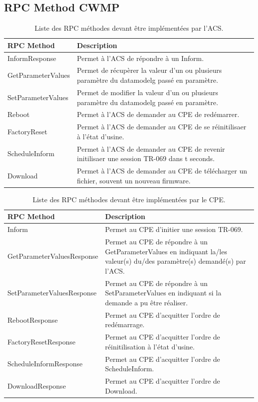 \documentclass[12pt,a4paper]{report}
\begin{document}
\begin{appendix}
\chapter{RPC Method CWMP}
\begin{table}
	\begin{tabularx}{17cm}{|l|X|}
		\hline
		RPC Method & Description\tabularnewline
		\hline
		InformResponse & Permet à l'ACS de répondre à un Inform.\tabularnewline
		\hline
		GetParameterValues & Permet de récupèrer la valeur d'un ou plusieurs 				paramètre du {datamodelg} passé en paramètre.\tabularnewline
		\hline
		SetParameterValues & Permet de modifier la valeur d'un ou plusieurs 				paramètre du {datamodelg} passé en paramètre.\tabularnewline
		\hline
		Reboot & Permet à l'ACS de demander au CPE de redémarrer.\tabularnewline
		\hline
		FactoryReset & Permet à l'ACS de demander au CPE de se réinitilisaer à l'état d'usine.\tabularnewline
		\hline
		ScheduleInform & Permet à l'ACS de demander au CPE de revenir initilisaer une session TR-069 dans t seconds.\tabularnewline
		\hline
		Download & Permet à l'ACS de demander au CPE de télécharger un fichier, souvent un nouveau firmware.\tabularnewline
		\hline
	\end{tabularx}
	\centering
	\caption{Liste des RPC méthodes devant être implémentées par l'ACS.}
\end{table}
\begin{table}
	\begin{tabularx}{17cm}{|l|X|}
		\hline
		RPC Method & Description\tabularnewline
		\hline
		Inform & Permet au CPE d'initier une session TR-069.\tabularnewline
		\hline
		GetParameterValuesResponse & Permet au CPE de répondre à un 						GetParameterValues en indiquant la/les valeur(s) du/des paramètre(s) 				demandé(s) par l'ACS.\tabularnewline
		\hline
		SetParameterValuesResponse & Permet au CPE de répondre à un 						SetParameterValues en indiquant si la demande a pu être réaliser.\tabularnewline
		\hline
		RebootResponse & Permet au CPE d'acquitter l'ordre de redémarrage.\tabularnewline
		\hline
		FactoryResetResponse & Permet au CPE d'acquitter l'ordre de réinitilisation à l'état d'usine.\tabularnewline
		\hline
		ScheduleInformResponse & Permet au CPE d'acquitter l'ordre de ScheduleInform.\tabularnewline
		\hline
		DownloadResponse & Permet au CPE d'acquitter l'ordre de Download.\tabularnewline
		\hline
	\end{tabularx}
	\centering
	\caption{Liste des RPC méthodes devant être implémentées par le CPE.}
\end{table}


\end{appendix}
\end{document}

